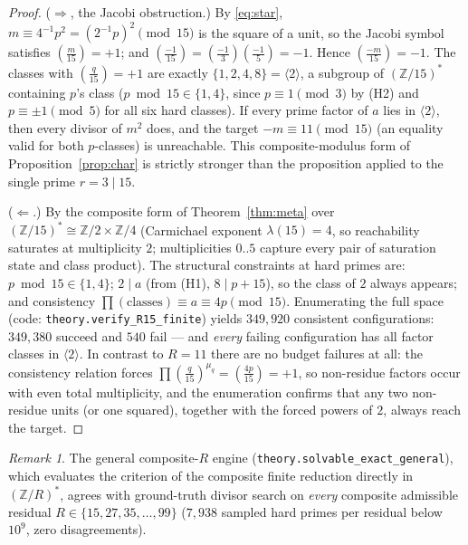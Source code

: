 \documentclass[11pt]{article}
\theoremstyle{plain}
\theoremstyle{remark}
\newtheorem{remark}[theorem]{Remark}
\theoremstyle{plain}
\numberwithin{equation}{section}
\newcommand{\legendre}[2]{\genfrac{(}{)}{}{1}{#1}{#2}}
\begin{document}
\begin{proof}
($\Rightarrow$, the Jacobi obstruction.) By \eqref{eq:star},
$m \equiv 4^{-1}p^2 = (2^{-1}p)^2 \pmod{15}$ is the square of a unit,
so the Jacobi symbol satisfies $\legendre{m}{15} = +1$; and
$\legendre{-1}{15} = \legendre{-1}{3}\legendre{-1}{5} = -1$. Hence
$\legendre{-m}{15} = -1$. The classes with $\legendre{q}{15} = +1$ are
exactly $\{1, 2, 4, 8\} = \langle 2 \rangle$, a subgroup of
$(\mathbb{Z}/15)^*$ containing $p$'s class ($p \bmod 15 \in \{1,4\}$,
since $p \equiv 1 \pmod 3$ by (H2) and $p \equiv \pm 1 \pmod 5$ for all
six hard classes). If every prime factor of $a$ lies in
$\langle 2 \rangle$, then every divisor of $m^2$ does, and the target
$-m \equiv 11 \pmod{15}$ (an equality valid for both $p$-classes) is
unreachable. This composite-modulus form of
Proposition~\ref{prop:char} is strictly stronger than the proposition
applied to the single prime $r = 3 \mid 15$.

($\Leftarrow$.) By the composite form of Theorem~\ref{thm:meta} over
$(\mathbb{Z}/15)^* \cong \mathbb{Z}/2 \times \mathbb{Z}/4$
(Carmichael exponent $\lambda(15) = 4$, so reachability saturates at
multiplicity $2$; multiplicities $0..5$ capture every pair of
saturation state and class product). The structural constraints at
hard primes are: $p \bmod 15 \in \{1, 4\}$; $2 \mid a$ (from (H1),
$8 \mid p + 15$), so the class of $2$ always appears; and consistency
$\prod(\text{classes}) \equiv a \equiv 4p \pmod{15}$. Enumerating the
full space (code: \texttt{theory.verify\_R15\_finite}) yields
$349{,}920$ consistent configurations: $349{,}380$ succeed and $540$
fail --- and \emph{every} failing configuration has all factor classes
in $\langle 2 \rangle$. In contrast to $R = 11$ there are no budget
failures at all: the consistency relation forces
$\prod \legendre{q}{15}^{\mu_q} = \legendre{4p}{15} = +1$, so
non-residue factors occur with even total multiplicity, and the
enumeration confirms that any two non-residue units (or one squared),
together with the forced powers of $2$, always reach the target.
\end{proof}

\begin{remark}
The general composite-$R$ engine (\texttt{theory.solvable\_exact\_general}),
which evaluates the criterion of the composite finite reduction directly in
$(\mathbb{Z}/R)^*$, agrees with ground-truth divisor search on
\emph{every} composite admissible residual
$R \in \{15, 27, 35, \dots, 99\}$ ($7{,}938$ sampled hard primes per
residual below $10^9$, zero disagreements).
\end{remark}
\end{document}
